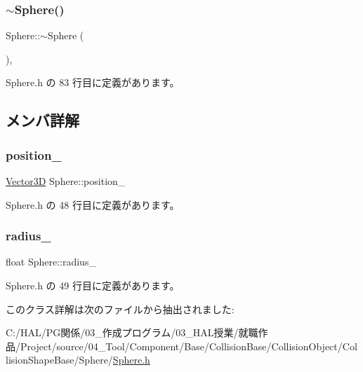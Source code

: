 \subsubsection{\texorpdfstring{$\sim$\+Sphere()}{~Sphere()}}
{\footnotesize\ttfamily Sphere\+::$\sim$\+Sphere (\begin{DoxyParamCaption}{ }\end{DoxyParamCaption})\hspace{0.3cm}{\ttfamily [inline]}, {\ttfamily [virtual]}}



 Sphere.\+h の 83 行目に定義があります。



\subsection{メンバ詳解}
\mbox{\label{class_sphere_a5a18bfcc7abcdfbd6802ec622dfa5590}} 
\subsubsection{\texorpdfstring{position\+\_\+}{position\_}}
{\footnotesize\ttfamily \mbox{\hyperlink{class_vector3_d}{Vector3D}} Sphere\+::position\+\_\+}



 Sphere.\+h の 48 行目に定義があります。

\mbox{\label{class_sphere_ac2924d9ad22bfad1ed1914c069c188dc}} 
\subsubsection{\texorpdfstring{radius\+\_\+}{radius\_}}
{\footnotesize\ttfamily float Sphere\+::radius\+\_\+}



 Sphere.\+h の 49 行目に定義があります。



このクラス詳解は次のファイルから抽出されました\+:\begin{DoxyCompactItemize}
\item 
C\+:/\+H\+A\+L/\+P\+G関係/03\+\_\+作成プログラム/03\+\_\+\+H\+A\+L授業/就職作品/\+Project/source/04\+\_\+\+Tool/\+Component/\+Base/\+Collision\+Base/\+Collision\+Object/\+Collision\+Shape\+Base/\+Sphere/\mbox{\hyperlink{_sphere_8h}{Sphere.\+h}}\end{DoxyCompactItemize}
